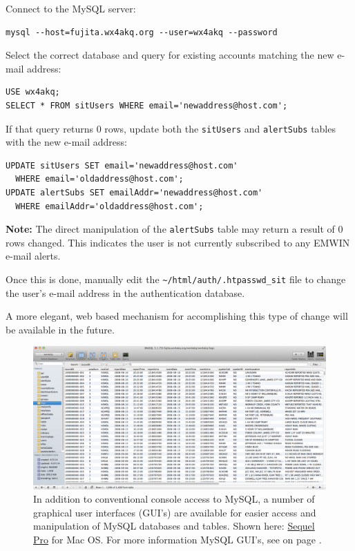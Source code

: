 \documentclass[pdflatex,letterpaper,twoside,12pt]{book}
\begin{document}
Connect to the MySQL server:

\begin{verbatim}
mysql --host=fujita.wx4akq.org --user=wx4akq --password
\end{verbatim}

Select the correct database and query for existing accounts matching the new e-mail address:

\begin{verbatim}
USE wx4akq;
SELECT * FROM sitUsers WHERE email='newaddress@host.com';
\end{verbatim}

If that query returns 0 rows, update both the \verb|sitUsers| and \verb|alertSubs| tables with the new e-mail address:

\begin{verbatim}
UPDATE sitUsers SET email='newaddress@host.com'
  WHERE email='oldaddress@host.com';
UPDATE alertSubs SET emailAddr='newaddress@host.com'
  WHERE emailAddr='oldaddress@host.com';
\end{verbatim}   

{\bf Note:}  The direct manipulation of the \verb|alertSubs| table may return a result of 0 rows changed.  This indicates the user is not currently subscribed to any EMWIN e-mail alerts.

Once this is done, manually edit the \verb|~/html/auth/.htpasswd_sit| file to change the user's e-mail address in the authentication database.

A more elegant, web based mechanism for accomplishing this type of change will be available in the future.

\begin{figure}[t]
  \centering
  \includegraphics[width=\textwidth,keepaspectratio=true]{img/sequel-pro}
  \caption{In addition to conventional console access to MySQL, a number of graphical user interfaces (GUI's) are available for easier access and manipulation of MySQL databases and tables.  Shown here: \href{http://www.sequelpro.com/}{Sequel Pro} for Mac OS.  For more information MySQL GUI's, see  on page \pageref{database-server}.\label{fig:sequel-pro}}
\end{figure}
\end{document}
